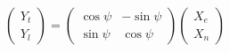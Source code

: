 \[
  \left( \begin{array}{c} Y_t \\ Y_l \end{array} \right)
  = 
  \left( \begin{array}{cc} \cos\psi & -\sin\psi \\ \sin\psi & \cos\psi \end{array} \right)
  \left( \begin{array}{c} X_e \\ X_n \end{array} \right)
\]

